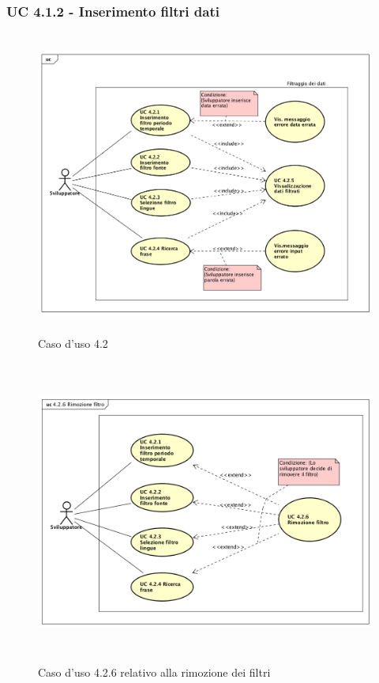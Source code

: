 \subsubsection{UC 4.1.2 - Inserimento filtri dati}
\begin{figure}[H]
\centering
\includegraphics[width=17cm, height=10cm]{img/UC420.png} 
\caption{Caso d'uso 4.2}\label{fig:420}
\end{figure}
\begin{figure}[H]
\centering
\includegraphics[width=17cm, height=10cm]{img/UC426.png} 
\caption{Caso d'uso 4.2.6 relativo alla rimozione dei filtri}\label{fig:426}
\end{figure}
